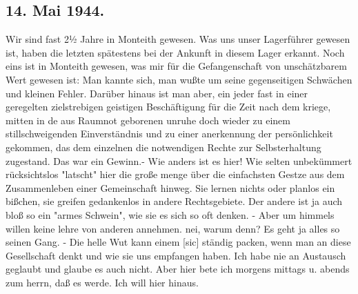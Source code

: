\subsection{14. Mai 1944.}
Wir sind fast 2½ Jahre in Monteith gewesen.
Was uns unser Lagerf\"{u}hrer gewesen ist, haben die letzten sp\"{a}testens bei der Ankunft in diesem Lager erkannt.
Noch eins ist in Monteith gewesen, was mir f\"{u}r die Gefangenschaft von unsch\"{a}tzbarem Wert gewesen ist: Man kannte sich, man wu{\ss}te um seine gegenseitigen Schw\"{a}chen und kleinen Fehler.
Dar\"{u}ber hinaus ist man aber, ein jeder fast in einer geregelten zielstrebigen geistigen Besch\"{a}ftigung f\"{u}r die Zeit nach dem kriege, mitten in de aus Raumnot geborenen unruhe doch wieder zu einem stillschweigenden Einverst\"{a}ndnis und zu einer anerkennung der pers\"{o}nlichkeit gekommen, das dem einzelnen die notwendigen Rechte zur Selbsterhaltung zugestand.
Das war ein Gewinn.-
Wie anders ist es hier!
Wie selten unbek\"{u}mmert r\"{u}cksichtslos "latscht" hier die gro{\ss}e menge \"{u}ber die einfachsten Gestze aus dem Zusammenleben einer Gemeinschaft hinweg.
Sie lernen nichts oder planlos ein bi{\ss}chen, sie greifen gedankenlos in andere Rechtsgebiete.
Der andere ist ja auch blo{\ss} so ein "armes Schwein", wie sie es sich so oft denken.
- Aber um himmels willen keine lehre von anderen annehmen.
nei, warum denn?
Es geht ja alles so seinen Gang. -
Die helle Wut kann einem{\color{red} [sic] } st\"{a}ndig packen, wenn man an diese Gesellschaft denkt und wie sie uns empfangen haben.
Ich habe nie an Austausch geglaubt und glaube es auch nicht.
Aber hier bete ich morgens mittags u. abends zum herrn, da{\ss} es werde.
Ich will hier hinaus.

\clearpage
